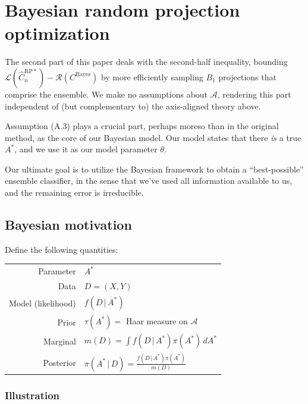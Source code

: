 \documentclass{amsart}
\newcommand\cbayes{C^{\mathrm{Bayes}}}
\newcommand\crpnhatstar{\hat{C}_{n}^{\mathrm{RP*}}}
\newcommand\risk{\mathcal{L}}
\newcommand\rrisk{\mathcal{R}}
\begin{document}
\newpage
\section{Bayesian random projection optimization}

The second part of this paper deals with the second-half inequality, bounding $\risk(\crpnhatstar) - \rrisk(\cbayes)$ by more efficiently sampling $B_1$ projections that comprise the ensemble. We make no assumptions about $\mathcal A$, rendering this part independent of (but complementary to) the axis-aligned theory above.

Assumption (A.3) plays a crucial part, perhaps moreso than in the original method, as the core of our Bayesian model. Our model states that there \emph{is} a true $A^*$, and we use it as our model parameter $\theta$.

Our ultimate goal is to utilize the Bayesian framework to obtain a ``best-possible'' ensemble classifier, in the sense that we've used all information available to us, and the remaining error is irreducible.

\subsection{Bayesian motivation}

Define the following quantities:

\begin{center}
	\begin{tabular}{r|l}
		Parameter & $A^*$ \\
		Data & $D=(X,Y)$ \\
		Model (likelihood) & $f(D\,|\,A^*)$ \\
		Prior & $\tau(A^*)=$ Haar measure on $\mathcal{A}$ \\
		Marginal & $m(D) = \int\!f(D\,|\,A^*)\pi(A^*)\,dA^*$ \\
		Posterior & $\pi(A^*\,|\,D) = \frac{f(D\,|\,A^*)\pi(A^*)}{m(D)}$
	\end{tabular}
\end{center}

\subsubsection{Illustration}
\end{document}
